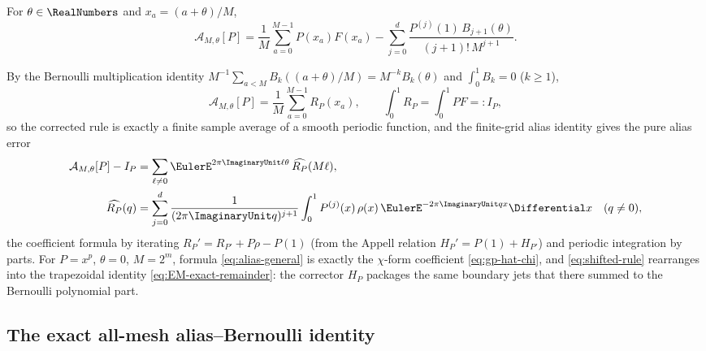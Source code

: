 \documentclass[11pt,oneside]{article}
\numberwithin{equation}{section}
\theoremstyle{definition}
\theoremstyle{remark}
\begin{document}
\begin{definition}
\label{def:shifted-rule}
For $\theta\in\RealNumbers$ and $x_a=(a+\theta)/M$,
\begin{equation}
 \mathcal A_{M,\theta}[P]
 =\frac1M\sum_{a=0}^{M-1}P(x_a)F(x_a)
 -\sum_{j=0}^{d}
 \frac{P^{(j)}(1)\,B_{j+1}(\theta)}{(j+1)!\,M^{j+1}}.
 \label{eq:shifted-rule}
\end{equation}
\end{definition}

By the Bernoulli multiplication identity
$M^{-1}\sum_{a<M}B_k((a+\theta)/M)=M^{-k}B_k(\theta)$ and
$\int_0^1B_k=0$ ($k\ge1$),
\begin{equation}
 \mathcal A_{M,\theta}[P]=\frac1M\sum_{a=0}^{M-1}R_P(x_a),
 \qquad
 \int_0^1R_P=\int_0^1PF=:I_P,
 \label{eq:periodized-average}
\end{equation}
so the corrected rule is exactly a finite sample average of a smooth
periodic function, and the finite-grid alias identity gives the pure
alias error
\begin{align}
 \mathcal A_{M,\theta}[P]-I_P
 &=\sum_{\ell\ne0}\EulerE^{2\pi\ImaginaryUnit\ell\theta}\,\widehat{R_P}(M\ell),
 \notag\\
 \widehat{R_P}(q)
 &=\sum_{j=0}^{d}\frac{1}{(2\pi\ImaginaryUnit q)^{j+1}}
 \int_0^1P^{(j)}(x)\,\rho(x)\,\EulerE^{-2\pi\ImaginaryUnit qx}\Differential x
 \quad(q\ne0),
 \label{eq:alias-general}
\end{align}
the coefficient formula by iterating $R_P'=R_{P'}+P\rho-P(1)$ (from the
Appell relation $H_P'=P(1)+H_{P'}$) and periodic integration by parts.
For $P=x^{p}$, $\theta=0$, $M=2^{m}$, formula \eqref{eq:alias-general}
is exactly the $\chi$-form coefficient
\eqref{eq:gp-hat-chi}, and \eqref{eq:shifted-rule} rearranges into the
trapezoidal identity \eqref{eq:EM-exact-remainder}: the corrector
$H_P$ packages the same boundary jets that there summed to the
Bernoulli polynomial part.

\subsection{The exact all-mesh alias--Bernoulli identity}
\end{document}
